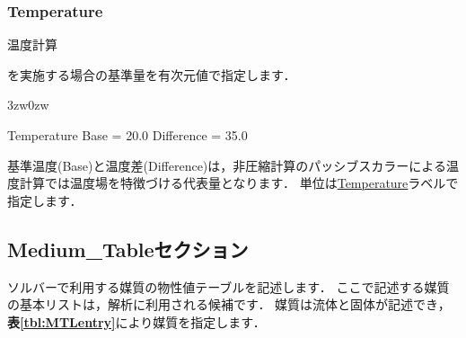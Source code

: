 \pagebreak
\subsubsection{Temperature}

\hypertarget{tgt:temperature}{温度計算}を実施する場合の基準量を有次元値で指定します．

\begin{indentation}{3zw}{0zw}

{\small
\begin{program}
  Temperature {
    Base       = 20.0
    Difference = 35.0
  }
\end{program}
}

基準温度(Base)と温度差(Difference)は，非圧縮計算のパッシブスカラーによる温度計算では温度場を特徴づける代表量となります．
単位は\hyperlink{tgt:unit}{Temperature}ラベルで指定します．

\end{indentation}



\pagebreak
\subsection{Medium\_Tableセクション}

ソルバーで利用する媒質の\hypertarget{tgt:medium_table}{物性値テーブル}を記述します．
ここで記述する媒質の基本リストは，解析に利用される候補です．
媒質は流体と固体が記述でき，\textbf{表\ref{tbl:MTLentry}}により媒質を指定します．


